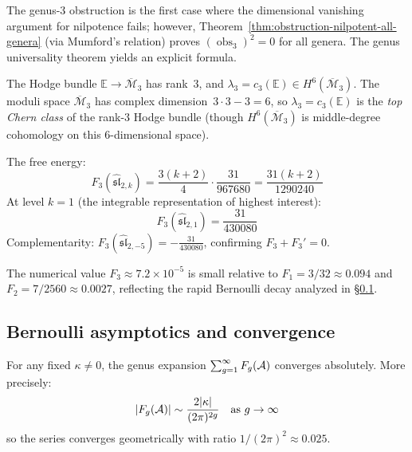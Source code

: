 \begin{computation}\label{comp:genus-3-sl2}
The genus-3 obstruction is the first case where the dimensional vanishing argument for nilpotence fails; however, Theorem~\ref{thm:obstruction-nilpotent-all-genera} (via Mumford's relation) proves $(\operatorname{obs}_3)^2 = 0$ for all genera.  The genus universality theorem yields an explicit formula.

The Hodge bundle $\mathbb{E} \to \overline{\mathcal{M}}_3$ has rank~$3$, and $\lambda_3 = c_3(\mathbb{E}) \in H^6(\overline{\mathcal{M}}_3)$.  The moduli space $\overline{\mathcal{M}}_3$ has complex dimension~$3 \cdot 3 - 3 = 6$, so $\lambda_3 = c_3(\mathbb{E})$ is the \emph{top Chern class} of the rank-$3$ Hodge bundle (though $H^6(\overline{\mathcal{M}}_3)$ is middle-degree cohomology on this $6$-dimensional space).

The free energy:
\[
F_3(\widehat{\mathfrak{sl}}_{2,k}) = \frac{3(k+2)}{4} \cdot \frac{31}{967680}
= \frac{31(k+2)}{1290240}
\]
At level $k = 1$ (the integrable representation of highest interest):
\begin{equation}\label{eq:genus3-k1}
F_3(\widehat{\mathfrak{sl}}_{2,1}) = \frac{31}{430080}
\end{equation}
Complementarity: $F_3(\widehat{\mathfrak{sl}}_{2,-5}) = -\frac{31}{430080}$, confirming $F_3 + F_3' = 0$.

The numerical value $F_3 \approx 7.2 \times 10^{-5}$ is small relative to $F_1 = 3/32 \approx 0.094$ and $F_2 = 7/2560 \approx 0.0027$, reflecting the rapid Bernoulli decay analyzed in \S\ref{subsec:bernoulli-asymptotics}.
\end{computation}

\subsection{Bernoulli asymptotics and convergence}\label{subsec:bernoulli-asymptotics}

\begin{proposition}\label{prop:genus-expansion-convergence}
For any fixed $\kappa \neq 0$, the genus expansion $\sum_{g=1}^\infty F_g(\mathcal{A})$ converges absolutely.  More precisely:
\begin{equation}\label{eq:Fg-asymptotics}
|F_g(\mathcal{A})| \sim \frac{2|\kappa|}{(2\pi)^{2g}} \quad \text{as } g \to \infty
\end{equation}
so the series converges geometrically with ratio $1/(2\pi)^2 \approx 0.025$.
\end{proposition}

